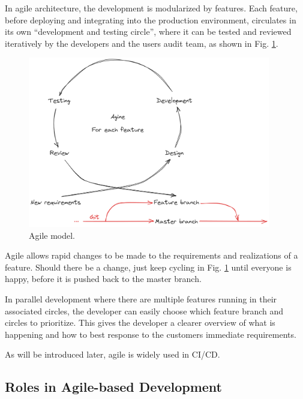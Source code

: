 In agile architecture, the development is modularized by features. Each feature, before deploying and integrating into the production environment, circulates in its own ``development and testing circle'', where it can be tested and reviewed iteratively by the developers and the users audit team, as shown in Fig. \ref{ch:cicd:fig:agile}.
\begin{figure}[!htb]
	\centering
	\includegraphics[width=300pt]{chapters/ap/figures/agile.png}
	\caption{Agile model.} \label{ch:cicd:fig:agile}
\end{figure}

Agile allows rapid changes to be made to the requirements and realizations of a feature. Should there be a change, just keep cycling in Fig. \ref{ch:cicd:fig:agile} until everyone is happy, before it is pushed back to the master branch.

In parallel development where there are multiple features running in their associated circles, the developer can easily choose which feature branch and circles to prioritize. This gives the developer a clearer overview of what is happening and how to best response to the customers immediate requirements.

As will be introduced later, agile is widely used in CI/CD.

\subsection{Roles in Agile-based Development}

